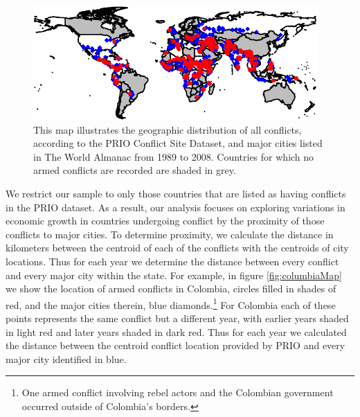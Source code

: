 \begin{figure}[ht]
	\centering
	\includegraphics[width=.9\textwidth]{CityConfMap-crop}
	\caption{This map illustrates the geographic distribution of all conflicts, according to the PRIO Conflict Site Dataset, and major cities listed in The World Almanac from 1989 to 2008. Countries for which no armed conflicts are recorded are shaded in grey.}
	\label{fig:CityConfMap}
\end{figure}

We restrict our sample to only those countries that are listed as having conflicts in the PRIO dataset. As a result, our analysis focuses on exploring variations in economic growth in countries undergoing conflict by the proximity of those conflicts to major cities. To determine proximity, we calculate the distance in kilometers between the centroid of each of the conflicts with the centroids of city locations. Thus for each year we determine the distance between every conflict and every major city within the state. For example, in figure \ref{fig:columbiaMap} we show the location of armed conflicts in Colombia, circles filled in shades of red, and the major cities therein, blue diamonds.\footnote{One armed conflict involving rebel actors and the Colombian government occurred outside of Colombia's borders.} For Colombia each of these points represents the same conflict but a different year, with earlier years shaded in light red and later years shaded in dark red. Thus for each year we calculated the distance between the centroid conflict location provided by PRIO and every major city identified in blue.

